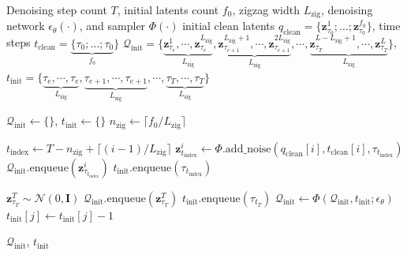 \documentclass{article}
\theoremstyle{plain}
\theoremstyle{definition}
\theoremstyle{remark}
\begin{document}
\begin{algorithm}[htbp]
\caption{Initial latents construction in MIGA}
\label{alg:miga_init}
\begin{algorithmic}[1]

 Denoising step count $T$, initial latents count $f_0$, zigzag width $L_{\mathrm{zig}}$, denoising network $\epsilon_{\theta}(\cdot)$, and sampler $\Phi(\cdot)$
 initial clean latents $q_\mathrm{clean}=\{\mathbf{z}_{\tau_0}^1; \ldots; \mathbf{z}_{\tau_0}^{f_0}\}$, time steps $t_\mathrm{clean}=\underbrace{\{\tau_0; \dots; \tau_0}_{f_0}\}$
$\mathcal{Q}_\mathrm{init} = \{
\underbrace{\mathbf{z}^1_{\tau _e}, \cdots, \mathbf{z}^{L_{\mathrm{zig}}}_{\tau_e}}_{L_{\mathrm{zig}}},
\underbrace{\mathbf{z}^{L_{\mathrm{zig}}+1}_{\tau_{e+1}}, \cdots, \mathbf{z}^{2L_{\mathrm{zig}}}_{\tau_{e+1}}}_{L_{\mathrm{zig}}},
\cdots,
\underbrace{\mathbf{z}^{L-L_{\mathrm{zig}}+1}_{\tau_T}, \cdots, \mathbf{z}^{L}_{\tau_T}}_{L_{\mathrm{zig}}}\}$, 
\STATE \quad $t_\mathrm{init} = \{
\underbrace{\tau_e, \cdots, \tau_e}_{L_{\mathrm{zig}}},
\underbrace{\tau_{e+1}, \cdots, \tau_{e+1}}_{L_{\mathrm{zig}}},
\cdots,
\underbrace{\tau_T, \cdots, \tau_T}_{L_{\mathrm{zig}}}\}$

\STATE $\mathcal{Q}_\mathrm{init} \gets \{\}$, \quad $t_\mathrm{init} \gets \{\}$
\STATE {\bfseries \textcolor{blue}{\# Manually add noise to the initial latents.}}
\STATE $n_{\mathrm{zig}} \gets \lceil f_0 / L_{\mathrm{zig}} \rceil$

    \STATE $t_{\mathrm{index}} \gets T - n_{\mathrm{zig}} + \lceil (i-1)/L_{\mathrm{zig}} \rceil$
    \STATE $\mathbf{z}_{t_{\mathrm{index}}}^i \gets \Phi.\mathrm{add\_noise}(q_\mathrm{clean}[i], t_\mathrm{clean}[i], \tau_{t_{\mathrm{index}}})$
    \STATE $\mathcal{Q}_\mathrm{init}.\text{enqueue}(\mathbf{z}_{\tau_{t_{\mathrm{index}}}}^i)$
    \STATE $t_\mathrm{init}.\text{enqueue}(\tau_{t_{\mathrm{index}}})$
\ENDFOR

\STATE {\bfseries \textcolor{blue}{\# Progressively guide the generation of subsequent latents using existing latents.}}
        \STATE $\mathbf{z}_{\tau_T}^T \sim \mathcal{N}(0, \mathbf{I})$
        \STATE $\mathcal{Q}_\mathrm{init}.\text{enqueue}(\mathbf{z}_{\tau_T}^T)$
        \STATE $t_\mathrm{init}.\text{enqueue}(\tau_{t_T})$
    \ENDFOR
    \STATE $\mathcal{Q}_\mathrm{init} \gets \Phi(\mathcal{Q}_\mathrm{init}, t_\mathrm{init}; \epsilon_{\theta})$
        \STATE $t_\mathrm{init}[j] \gets t_\mathrm{init}[j] - 1$
    \ENDFOR
\ENDFOR

 $\mathcal{Q}_\mathrm{init}$, \quad $t_\mathrm{init}$

\end{algorithmic}
\end{algorithm}
\end{document}
